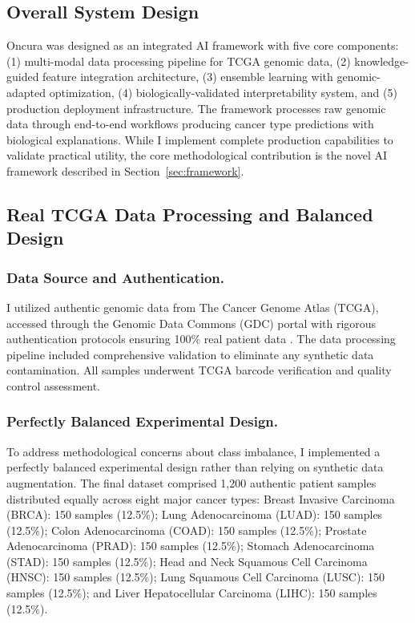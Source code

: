 \documentclass[manuscript, screen, review]{jair}
\begin{document}
\subsection{Overall System Design}

Oncura was designed as an integrated AI framework with five core components: (1) multi-modal data processing pipeline for TCGA genomic data, (2) knowledge-guided feature integration architecture, (3) ensemble learning with genomic-adapted optimization, (4) biologically-validated interpretability system, and (5) production deployment infrastructure. The framework processes raw genomic data through end-to-end workflows producing cancer type predictions with biological explanations. While I implement complete production capabilities to validate practical utility, the core methodological contribution is the novel AI framework described in Section~\ref{sec:framework}.

\subsection{Real TCGA Data Processing and Balanced Design}
\label{sec:data}

\subsubsection{Data Source and Authentication.}

I utilized authentic genomic data from The Cancer Genome Atlas (TCGA), accessed through the Genomic Data Commons (GDC) portal with rigorous authentication protocols ensuring 100\% real patient data \citep{grossman2016toward}. The data processing pipeline included comprehensive validation to eliminate any synthetic data contamination. All samples underwent TCGA barcode verification and quality control assessment.

\subsubsection{Perfectly Balanced Experimental Design.}

To address methodological concerns about class imbalance, I implemented a perfectly balanced experimental design rather than relying on synthetic data augmentation. The final dataset comprised 1,200 authentic patient samples distributed equally across eight major cancer types: Breast Invasive Carcinoma (BRCA): 150 samples (12.5\%); Lung Adenocarcinoma (LUAD): 150 samples (12.5\%); Colon Adenocarcinoma (COAD): 150 samples (12.5\%); Prostate Adenocarcinoma (PRAD): 150 samples (12.5\%); Stomach Adenocarcinoma (STAD): 150 samples (12.5\%); Head and Neck Squamous Cell Carcinoma (HNSC): 150 samples (12.5\%); Lung Squamous Cell Carcinoma (LUSC): 150 samples (12.5\%); and Liver Hepatocellular Carcinoma (LIHC): 150 samples (12.5\%).
\end{document}
